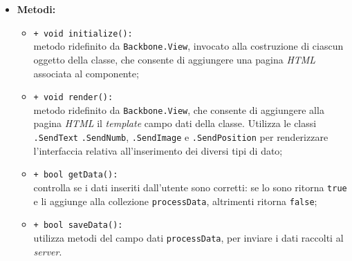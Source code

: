 \begin{flushleft}
\begin{itemize}
\begin{sloppypar}
\begin{itemize}
\end{itemize}
\end{sloppypar}
\item \textbf{Metodi:}
\begin{sloppypar}
\begin{itemize}
\item \texttt{+ void initialize():}\\ metodo ridefinito da \texttt{Backbone.View}, invocato alla costruzione di ciascun oggetto della classe, che consente di aggiungere una pagina \textit{HTML} associata al componente;
\item \texttt{+ void render():}\\ metodo ridefinito da \texttt{Backbone.View}, che consente di aggiungere alla pagina \textit{HTML} il \textit{template} campo dati della classe. Utilizza le classi \texttt{\logicUser{}.SendText} \texttt{\logicUser{}.SendNumb}, \texttt{\logicUser{}.SendImage} e \texttt{\logicUser{}.SendPosition} per renderizzare l'interfaccia relativa all'inserimento dei diversi tipi di dato;
\item \texttt{+ bool getData():}\\ controlla se i dati inseriti dall'utente sono corretti: se lo sono ritorna \texttt{true} e li aggiunge alla collezione \texttt{processData}, altrimenti ritorna \texttt{false};
\item \texttt{+ bool saveData():}\\ utilizza metodi del campo dati \texttt{processData}, per inviare i dati raccolti al \textit{server}.
\end{itemize}
\end{sloppypar}
\end{itemize}
\end{flushleft}

